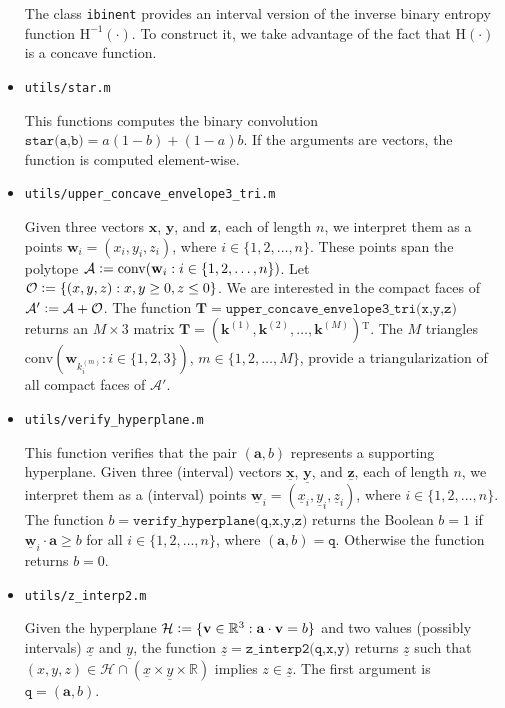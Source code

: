 \documentclass[a4paper,12pt]{scrartcl}
\newcommand{\cvx}[1]{\ensuremath{\mathrm{conv}(#1)}}
\newcommand{\ul}[1]{\ensuremath{\underline{#1}}}
\newcommand{\mat}[1]{\ensuremath{\mathbf{#1}}}
\newcommand{\vt}[1]{\ensuremath{\mathbf{#1}}}
\newcommand{\transp}{\ensuremath{^{\mathrm T}}}
\newcommand{\AAA}{\ensuremath{\mathcal A}}
\newcommand{\HHH}{\ensuremath{\mathcal H}}
\newcommand{\OOO}{\ensuremath{\mathcal O}}
\newcommand{\RR}{\ensuremath{\mathbb R}}
\newcommand{\defas}{\vcentcolon=}
\newcommand{\binEnt}[1]{\ensuremath{\mathrm{H}(#1)}}
\newcommand{\binEntInv}[1]{\ensuremath{\mathrm{H}^{-1}(#1)}}
\newcommand{\Nto}[1]{\ensuremath{\{1,2,\dots,#1\}}}
\begin{document}
\begin{itemize}
  The class \texttt{ibinent} provides an interval version of the inverse binary entropy function $\binEntInv{\cdot}$. To construct it, we take advantage of the fact that $\binEnt{\cdot}$ is a concave function.
  
  

  
\item \texttt{utils/star.m}

  This functions computes the binary convolution $\texttt{star(a,b)} = a (1-b) + (1-a) b$. If the arguments are vectors, the function is computed element-wise.
  
  
  
\item \texttt{utils/upper\_concave\_envelope3\_tri.m}

  Given three vectors $\vt x$, $\vt y$, and $\vt z$, each of length $n$, we interpret them as a points $\vt w_i = (x_i, y_i, z_i)$, where $i \in \Nto{n}$.
  These points span the polytope $\AAA \defas \cvx{\vt w_i : i \in \Nto{n}}$. Let $\OOO \defas \{(x,y,z) : x,y \ge 0, z \le 0 \}$. We are interested in the compact faces of $\AAA' \defas \AAA + \OOO$. The function $\mat T = \texttt{upper\_concave\_envelope3\_tri(x,y,z)}$ returns an $M \times 3$ matrix $\mat T = (\vt k^{(1)}, \vt k^{(2)}, \dots ,\vt k^{(M)})\transp$. The $M$ triangles $\cvx{\vt w_{k^{(m)}_i} : i \in \{1,2,3\}}$, $m \in \Nto{M}$, provide a triangularization of all compact faces of $\AAA'$.
  
  
  
\item \texttt{utils/verify\_hyperplane.m}

  This function verifies that the pair $(\vt a, b)$ represents a supporting hyperplane. Given three (interval) vectors $\ul{\vt x}$, $\ul{\vt y}$, and $\ul{\vt z}$, each of length $n$, we interpret them as a (interval) points $\ul{\vt w}_i = (\ul x_i, \ul y_i, \ul z_i)$, where $i \in \Nto{n}$. The function $b=\texttt{verify\_hyperplane(q,x,y,z)}$ returns the Boolean $b = 1$ if $\ul{\vt w}_i \cdot \vt a \ge b$ for all $i \in \Nto{n}$, where $(\vt a, b) = \texttt{q}$. Otherwise the function returns $b = 0$.

  
\item \texttt{utils/z\_interp2.m}

  Given the hyperplane $\HHH \defas \{\vt v \in \RR^3: \vt a \cdot \vt v = b\}$ and two values (possibly intervals) $\ul x$ and $\ul y$, the function $\ul z =  \texttt{z\_interp2(q,x,y)}$ returns $\ul z$ such that $(x,y,z) \in \HHH \cap ( \ul x \times \ul y \times \RR )$ implies $z \in \ul z$. The first argument is $\texttt{q} = (\vt a, b)$.
  
  
\end{itemize}
 


\printbibliography[heading=bibintoc]
\end{document}
